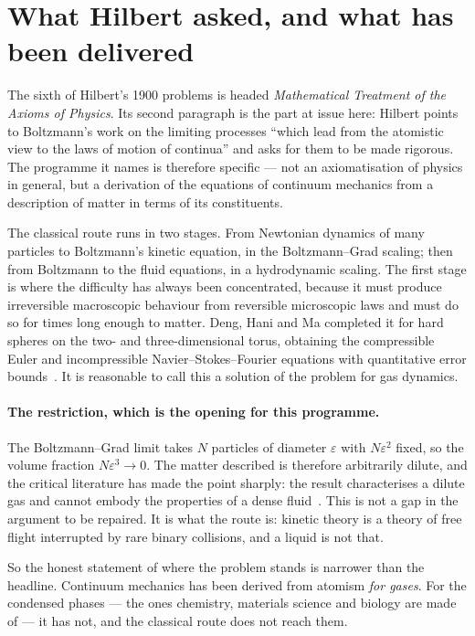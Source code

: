 \documentclass[11pt]{article}
\begin{document}
\section{What Hilbert asked, and what has been delivered}\label{sec:ask}

The sixth of Hilbert's 1900 problems is headed \emph{Mathematical Treatment of the Axioms of
Physics}. Its second paragraph is the part at issue here: Hilbert points to Boltzmann's work on the
limiting processes ``which lead from the atomistic view to the laws of motion of continua'' and asks
for them to be made rigorous. The programme it names is therefore specific --- not an axiomatisation
of physics in general, but a derivation of the equations of continuum mechanics from a description
of matter in terms of its constituents.

The classical route runs in two stages. From Newtonian dynamics of many particles to Boltzmann's
kinetic equation, in the Boltzmann--Grad scaling; then from Boltzmann to the fluid equations, in a
hydrodynamic scaling. The first stage is where the difficulty has always been concentrated, because
it must produce irreversible macroscopic behaviour from reversible microscopic laws and must do so
for times long enough to matter. Deng, Hani and Ma completed it for hard spheres on the two- and
three-dimensional torus, obtaining the compressible Euler and incompressible Navier--Stokes--Fourier
equations with quantitative error bounds~\cite{DHM2025}. It is reasonable to call this a solution of
the problem for gas dynamics.

\paragraph{The restriction, which is the opening for this programme.} The Boltzmann--Grad limit takes
$N$ particles of diameter $\varepsilon$ with $N\varepsilon^2$ fixed, so the volume fraction
$N\varepsilon^3 \to 0$. The matter described is therefore arbitrarily dilute, and the critical
literature has made the point sharply: the result characterises a dilute gas and cannot embody the
properties of a dense fluid~\cite{Comment2025}. This is not a gap in the argument to be repaired. It
is what the route is: kinetic theory is a theory of free flight interrupted by rare binary
collisions, and a liquid is not that.

So the honest statement of where the problem stands is narrower than the headline. Continuum
mechanics has been derived from atomism \emph{for gases}. For the condensed phases --- the ones
chemistry, materials science and biology are made of --- it has not, and the classical route does
not reach them.
\end{document}
